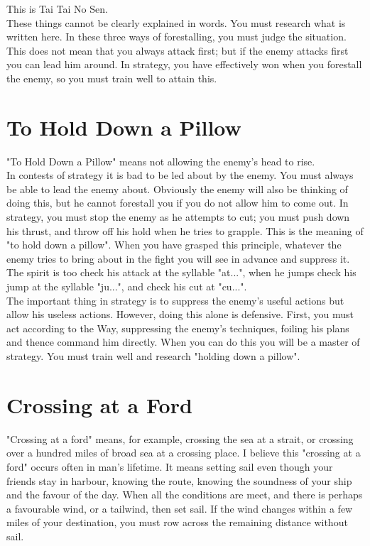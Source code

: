 This is Tai Tai No Sen.\\

These things cannot be clearly explained in words. You must research what is written here. In these three ways of forestalling, you must judge the situation. This does not mean that you always attack first; but if the enemy attacks first you can lead him around. In strategy, you have effectively won when you forestall the enemy, so you must train well to attain this.\\
\section{To Hold Down a Pillow}

"To Hold Down a Pillow" means not allowing the enemy's head to rise.\\

In contests of strategy it is bad to be led about by the enemy. You must always be able to lead the enemy about. Obviously the enemy will also be thinking of doing this, but he cannot forestall you if you do not allow him to come out. In strategy, you must stop the enemy as he attempts to cut; you must push down his thrust, and throw off his hold when he tries to grapple. This is the meaning of "to hold down a pillow". When you have grasped this principle, whatever the enemy tries to bring about in the fight you will see in advance and suppress it. The spirit is too check his attack at the syllable "at...", when he jumps check his jump at the syllable "ju...", and check his cut at "cu...".\\

The important thing in strategy is to suppress the enemy's useful actions but allow his useless actions. However, doing this alone is defensive. First, you must act according to the Way, suppressing the enemy's techniques, foiling his plans and thence command him directly. When you can do this you will be a master of strategy. You must train well and research "holding down a pillow".\\
\section{Crossing at a Ford}

"Crossing at a ford" means, for example, crossing the sea at a strait, or crossing over a hundred miles of broad sea at a crossing place. I believe this "crossing at a ford" occurs often in man's lifetime. It means setting sail even though your friends stay in harbour, knowing the route, knowing the soundness of your ship and the favour of the day. When all the conditions are meet, and there is perhaps a favourable wind, or a tailwind, then set sail. If the wind changes within a few miles of your destination, you must row across the remaining distance without sail.\\


